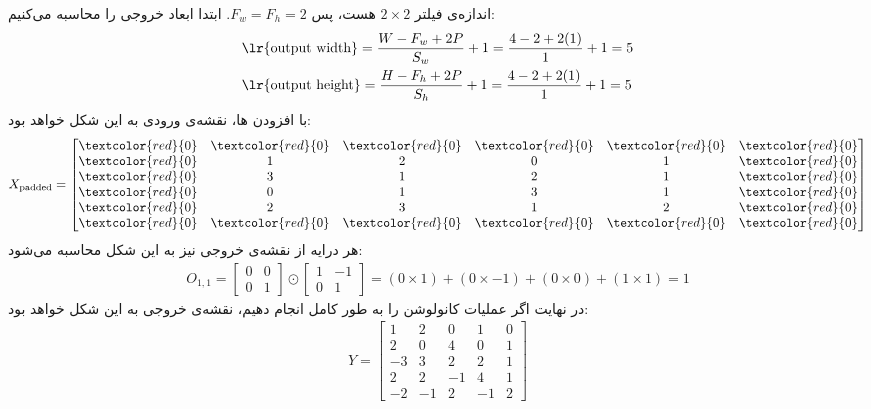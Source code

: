 
\begin{ابجد}
\item اندازه‌ی فیلتر $2\times2$ هست، پس $F_w = F_h = 2$. ابتدا ابعاد خروجی را محاسبه می‌کنیم:
\begin{align*}
     & \text{\lr{output width}} = \frac{W - F_w + 2P}{S_w} + 1 = \frac{4 - 2 + 2(1)}{1} + 1 = 5  \\
     & \text{\lr{output height}} = \frac{H - F_h + 2P}{S_h} + 1 = \frac{4 - 2 + 2(1)}{1} + 1 = 5
\end{align*}
با افزودن  ها، نقشه‌ی ورودی به این شکل خواهد بود:
\begin{align*}
    X_{\text{padded}} = \begin{bmatrix}
                            \textcolor{red}{0} & \textcolor{red}{0} & \textcolor{red}{0} & \textcolor{red}{0} & \textcolor{red}{0} & \textcolor{red}{0} \\
                            \textcolor{red}{0} & 1                  & 2                  & 0                  & 1                  & \textcolor{red}{0} \\
                            \textcolor{red}{0} & 3                  & 1                  & 2                  & 1                  & \textcolor{red}{0} \\
                            \textcolor{red}{0} & 0                  & 1                  & 3                  & 1                  & \textcolor{red}{0} \\
                            \textcolor{red}{0} & 2                  & 3                  & 1                  & 2                  & \textcolor{red}{0} \\
                            \textcolor{red}{0} & \textcolor{red}{0} & \textcolor{red}{0} & \textcolor{red}{0} & \textcolor{red}{0} & \textcolor{red}{0}
                        \end{bmatrix}
\end{align*}
هر درایه از نقشه‌ی خروجی نیز به این شکل محاسبه می‌شود:
\begin{align*}
    O_{1,1} = \begin{bmatrix} 0 & 0 \\ 0 & 1 \end{bmatrix} \odot \begin{bmatrix} 1 & -1 \\ 0 & 1 \end{bmatrix} = (0 \times 1) + (0 \times -1) + (0 \times 0) + (1 \times 1) = 1
\end{align*}
در نهایت اگر عملیات کانولوشن را به طور کامل انجام دهیم، نقشه‌ی خروجی به این شکل خواهد بود:
\begin{align*}
    Y = \begin{bmatrix}
            1  & 2  & 0  & 1  & 0 \\
            2  & 0  & 4  & 0  & 1 \\
            -3 & 3  & 2  & 2  & 1 \\
            2  & 2  & -1 & 4  & 1 \\
            -2 & -1 & 2  & -1 & 2
        \end{bmatrix}
\end{align*}


\end{ابجد}

